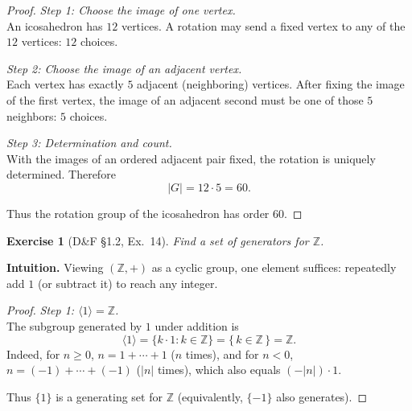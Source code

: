 \documentclass[12pt]{article}
\newtheorem{exercise}[theorem]{Exercise}
\theoremstyle{definition}
\begin{document}
\begin{proof}
\noindent\emph{Step 1: Choose the image of one vertex.}\\

\noindent
An icosahedron has $12$ vertices. A rotation may send a fixed vertex to any of the $12$ vertices: $12$ choices.

\dotfill

\noindent\emph{Step 2: Choose the image of an adjacent vertex.}\\

\noindent
Each vertex has exactly $5$ adjacent (neighboring) vertices. After fixing the image of the first vertex, the image
of an adjacent second must be one of those $5$ neighbors: $5$ choices.

\dotfill

\noindent\emph{Step 3: Determination and count.}\\

\noindent
With the images of an ordered adjacent pair fixed, the rotation is uniquely determined. Therefore
\[
\lvert G\rvert=12\cdot 5=60.
\]

\dotfill

Thus the rotation group of the icosahedron has order $60$.
\end{proof}

\newpage

\begin{exercise}[D\&F §1.2, Ex.~14]
Find a set of generators for $\mathbb{Z}$.
\end{exercise}

\dotfill

\noindent
\textbf{Intuition.}
Viewing $(\mathbb{Z},+)$ as a cyclic group, one element suffices: repeatedly add $1$ (or subtract it) to reach any integer.

\dotfill

\begin{proof}
\noindent\emph{Step 1: $\langle 1\rangle=\mathbb{Z}$.}\\

\noindent
The subgroup generated by $1$ under addition is
\[
\langle 1\rangle=\{k\cdot 1 : k\in\mathbb{Z}\}=\{\,k\in\mathbb{Z}\,\}=\mathbb{Z}.
\]
Indeed, for $n\ge 0$, $n=1+\cdots+1$ ($n$ times), and for $n<0$, $n=(-1)+\cdots+(-1)$ ($|n|$ times), which also equals $(-|n|)\cdot 1$.

\dotfill

Thus $\{1\}$ is a generating set for $\mathbb{Z}$ (equivalently, $\{-1\}$ also generates).
\end{proof}
\end{document}
